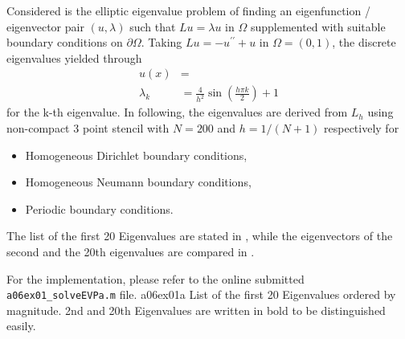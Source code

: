 

Considered is the elliptic eigenvalue problem of finding an eigenfunction / eigenvector pair $(u, \lambda)$ such that $L u = \lambda u$ in $\Omega$ supplemented with suitable boundary conditions on $\partial \Omega$.
%
Taking $L u = -u^{\prime \prime} + u$ in $\Omega = (0,1)$, the discrete eigenvalues yielded through
%
\begin{align}
	u(x) 	   &= \\
	\lambda _k &= \frac{4}{h^2} \sin{\left( \frac{h \pi k}{2}\right)} + 1
\end{align}
%
for the k-th eigenvalue.
%
In following, the eigenvalues are derived from $L_h$ using non-compact 3 point stencil with $N = 200$ and $h = 1/(N+1)$ respectively for
%
\begin{itemize}
	\item Homogeneous Dirichlet boundary conditions,
	\item Homogeneous Neumann boundary conditions,
	\item Periodic boundary conditions.
\end{itemize}
%
The list of the first 20 Eigenvalues  are stated in , while the eigenvectors of the second and the 20th eigenvalues are compared in .
%
\par
For the implementation, please refer to the online submitted \texttt{a06ex01\_solveEVPa.m} file.
		 {a06ex01a}
		 {List of the first 20 Eigenvalues ordered by magnitude.
		  2nd and 20th Eigenvalues are written in bold to be distinguished easily.}

